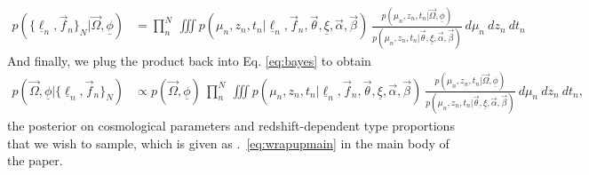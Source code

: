 \documentclass[12pt, onecolumn]{emulateapj}
\newcommand{\textul}{\underline}
\begin{document}
\begin{strip}
\begin{appendix}
\begin{align}
\label{eq:plugin}
p(\{\textul{\ell}_{n}, \vec{f}_{n}\}_{N} | \vec{\Omega}, \textul{\phi}) &= \prod_{n}^{N}\ \iiint p(\mu_{n}, z_{n}, t_{n} | \textul{\ell}_{n}, \vec{f}_{n}, \vec{\theta}, \textul{\xi}, \vec{\alpha}, \vec{\beta})\ \frac{p(\mu_{n}, z_{n}, t_{n} | \vec{\Omega}, \textul{\phi})}{p(\mu_{n}, z_{n}, t_{n} | \vec{\theta}, \textul{\xi}, \vec{\alpha}, \vec{\beta})}\ d\mu_{n}\ dz_{n}\ dt_{n}
\end{align}
And finally, we plug the product back into Eq. \ref{eq:bayes} to obtain
\begin{align}
\label{eq:wrapup}
p(\vec{\Omega}, \textul{\phi} | \{\textul{\ell}_{n}, \vec{f}_{n}\}_{N}) &\propto p(\vec{\Omega}, \textul{\phi})\ \prod_{n}^{N}\ \iiint p(\mu_{n}, z_{n}, t_{n} | \textul{\ell}_{n}, \vec{f}_{n}, \vec{\theta}, \textul{\xi}, \vec{\alpha}, \vec{\beta})\ \frac{p(\mu_{n}, z_{n}, t_{n} | \vec{\Omega}, \textul{\phi})}{p(\mu_{n}, z_{n}, t_{n} | \vec{\theta}, \textul{\xi}, \vec{\alpha}, \vec{\beta})}\ d\mu_{n}\ dz_{n}\ dt_{n},
\end{align}
the posterior on cosmological parameters and redshift-dependent type proportions that we wish to sample, which is given as \Eq.~\ref{eq:wrapupmain} in the main body of the paper.
\end{appendix}
\end{strip}
\end{document}

